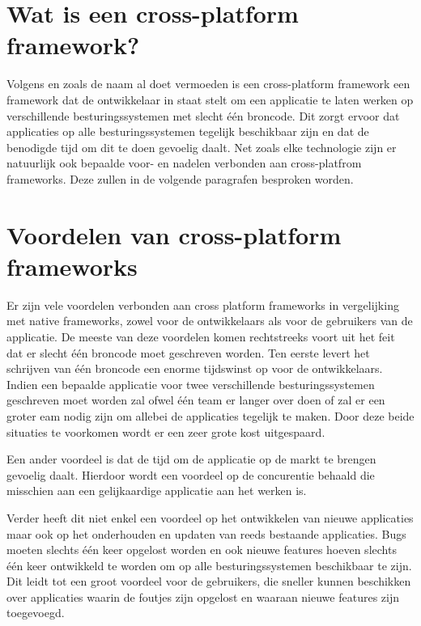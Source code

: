 \section{Wat is een cross-platform framework?}

 Volgens \textcite{El-Kassas2014} en zoals de naam al doet vermoeden is een cross-platform framework een framework dat de ontwikkelaar in staat stelt om een applicatie te laten werken op verschillende besturingssystemen met slecht één broncode. Dit zorgt ervoor dat applicaties op alle besturingssystemen tegelijk beschikbaar zijn en dat de benodigde tijd om dit te doen gevoelig daalt. Net zoals elke technologie zijn er natuurlijk ook bepaalde voor- en nadelen verbonden aan cross-platfrom frameworks. Deze zullen in de volgende paragrafen besproken worden.
 
\section{Voordelen van cross-platform frameworks}

Er zijn vele voordelen verbonden aan cross platform frameworks in vergelijking met native frameworks, zowel voor de ontwikkelaars als voor de gebruikers van de applicatie. De meeste van deze voordelen komen rechtstreeks voort uit het feit dat er slecht één broncode moet geschreven worden. Ten eerste levert het schrijven van één broncode een enorme tijdswinst op voor de ontwikkelaars. Indien een bepaalde applicatie voor twee verschillende besturingssystemen geschreven moet worden zal ofwel één team er langer over doen of zal er een groter eam nodig zijn om allebei de applicaties tegelijk te maken. Door deze beide situaties te voorkomen wordt er een zeer grote kost uitgespaard. 

Een ander voordeel is dat de tijd om de applicatie op de markt te brengen gevoelig daalt. Hierdoor wordt een voordeel op de concurentie behaald die misschien aan een gelijkaardige applicatie aan het werken is. 

Verder heeft dit niet enkel een voordeel op het ontwikkelen van nieuwe applicaties maar ook op het onderhouden en updaten van reeds bestaande applicaties. Bugs moeten slechts één keer opgelost worden en ook nieuwe features hoeven slechts één keer ontwikkeld te worden om op alle besturingssystemen beschikbaar te zijn. Dit leidt tot een groot voordeel voor de gebruikers, die sneller kunnen beschikken over applicaties waarin de foutjes zijn opgelost en waaraan nieuwe features zijn toegevoegd. 

